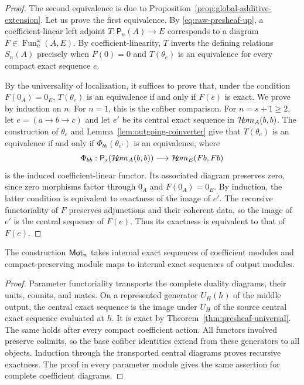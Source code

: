 \begin{proof}
The second equivalence is due to Proposition~\ref{prop:global-additive-extension}.
Let us prove the first equivalence.
By \eqref{eq:raw-presheaf-up}, a coefficient-linear
left adjoint $T:\mathsf P_n(A)\to E$ corresponds to
a diagram $F\in\operatorname{Fun}_n^\omega(A,E)$.
By coefficient-linearity, $T$ inverts the defining
relations \(S_n(A)\) precisely when $F(0)=0$ and $T(\theta_e)$
is an equivalence for every compact exact sequence $e$.

By the universality of localization, it suffices to prove that, under the condition \(F(0_A)=0_E\), \(T(\theta_e)\) is an equivalence if and only if \(F(e)\) is exact.
We prove by induction on $n$.
For $n=1$, this is the cofiber comparison.
For $n=s+1\geq2$, let $e=(a\to b\to c)$ and let
$e'$ be its central exact sequence in $\mathcal{H}\!om_A(b,b)$.
The construction of $\theta_e$ and
Lemma~\ref{lem:outgoing-coinverter} give that \(
 T(\theta_e)\) is an equivalence if and only if \(\Phi_{bb}(\theta_{e'})\) is an equivalence, where
\[
 \Phi_{bb}:\mathsf P_s(\mathcal{H}\!om_A(b,b))
 \longrightarrow\mathcal{H}\!om_E(Fb,Fb)
\]
is the induced coefficient-linear functor.
Its associated diagram preserves zero, since
zero morphisms factor through $0_A$ and $F(0_A)=0_E$.
By induction, the latter condition is equivalent to
exactness of the image of $e'$.
The recursive functoriality of $F$ preserves
adjunctions and their coherent data, so the
image of $e'$ is the central sequence of $F(e)$.
Thus its exactness is equivalent to that of $F(e)$.
\end{proof}







\begin{lemma}\label{lem:module-row-preservation}
The construction $\mathsf{Mot}_n$ takes internal exact sequences of coefficient
modules and compact-preserving module maps to internal exact sequences
of output modules.
\end{lemma}

\begin{proof}
Parameter functoriality transports the complete duality diagrams,
their units, counits, and mates. On a represented generator $U_H(h)$
of the middle output, the central exact sequence is the image under $U_H$ of
the source central exact sequence evaluated at $h$. It is exact by
Theorem~\ref{thm:presheaf-universal}. The same holds after every
compact coefficient action. All functors involved preserve colimits,
so the base cofiber identities extend from these generators to all
objects. Induction through the transported central diagrams proves
recursive exactness. The proof in every parameter module gives the
same assertion for complete coefficient diagrams.
\end{proof}




